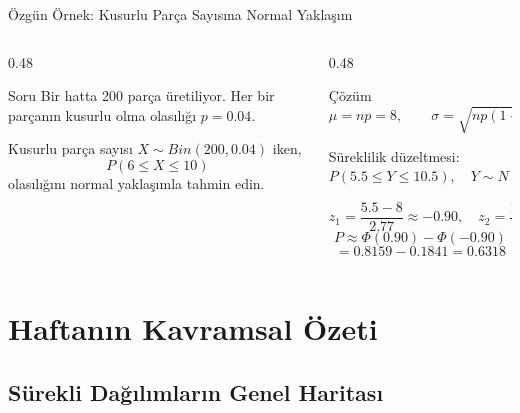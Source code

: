 \documentclass[light]{lutbeamer}
\begin{document}
\begin{frame}{Özgün Örnek: Kusurlu Parça Sayısına Normal Yaklaşım}
\small
\begin{columns}[T,onlytextwidth]
    \begin{column}{0.48\textwidth}
        \begin{block}{Soru}
            Bir hatta 200 parça üretiliyor. Her bir parçanın kusurlu olma olasılığı $p=0.04$.

            \vspace{0.15cm}
            Kusurlu parça sayısı $X \sim Bin(200,0.04)$ iken,
            \[
            P(6 \le X \le 10)
            \]
            olasılığını normal yaklaşımla tahmin edin.
        \end{block}
    \end{column}
    \begin{column}{0.48\textwidth}
        \begin{exampleblock}{Çözüm}
            \[
            \mu=np=8,\qquad \sigma=\sqrt{np(1-p)}=\sqrt{7.68}\approx 2.77
            \]

            Süreklilik düzeltmesi:
            \[
            P(5.5 \le Y \le 10.5), \quad Y \sim N(8,2.77^2)
            \]

            \[
            z_1=\frac{5.5-8}{2.77}\approx -0.90,\quad z_2=\frac{10.5-8}{2.77}\approx 0.90
            \]
            \[
            P \approx \Phi(0.90)-\Phi(-0.90)
            \]
            \[
            =0.8159-0.1841=0.6318
            \]
        \end{exampleblock}
    \end{column}
\end{columns}
\end{frame}

\section{Haftanın Kavramsal Özeti}
\subsection{Sürekli Dağılımların Genel Haritası}
\end{document}
